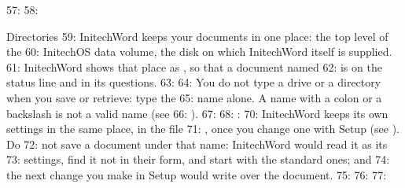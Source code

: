 57: 
58: \begin{Feature}{Directories}
59: InitechWord keeps your documents in one place: the top level of the
60: InitechOS data volume, the disk on which InitechWord itself is supplied.
61: InitechWord shows that place as , so that a document named
62:  is  on the status line and in its questions.
63: 
64: You do not type a drive or a directory when you save or retrieve: type the
65: name alone.  A name with a colon or a backslash is not a valid name (see
66: ).
67: 
68: : 
70: InitechWord keeps its own settings in the same place, in the file
71: , once you change one with Setup (see ).  Do
72: not save a document under that name: InitechWord would read it as its
73: settings, find it not in their form, and start with the standard ones; and
74: the next change you make in Setup would write over the document.
75: 
76: 
77: \end{Feature}
